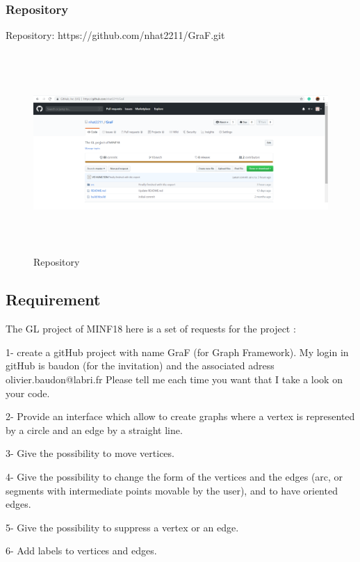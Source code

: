 \documentclass[a4paper,10pt]{article}
\begin{document}
\subsubsection{Repository}
 Repository: https://github.com/nhat2211/GraF.git
 \begin{figure}[H]
		\centering
		\includegraphics[height = 3in]{gitImage.png}
		\caption[Optional caption]{Repository}
		\label{fig:Repository}
	\end{figure}
\paragraph{}
\subsection{Requirement} 
The GL project of MINF18 here is a set of requests for the project :

1- create a gitHub project with name GraF (for Graph Framework). My login in gitHub is baudon (for the invitation) and the associated adress olivier.baudon@labri.fr Please tell me each time you want that I take a look on your code.

2- Provide an interface which allow to create graphs where a vertex is represented by a circle and an edge by a straight line.

3- Give the possibility to move vertices.

4- Give the possibility to change the form of the vertices and the edges (arc, or segments with intermediate points movable by the user), and to have oriented edges.

5- Give the possibility to suppress a vertex or an edge.

6- Add labels to vertices and edges.
\end{document}
